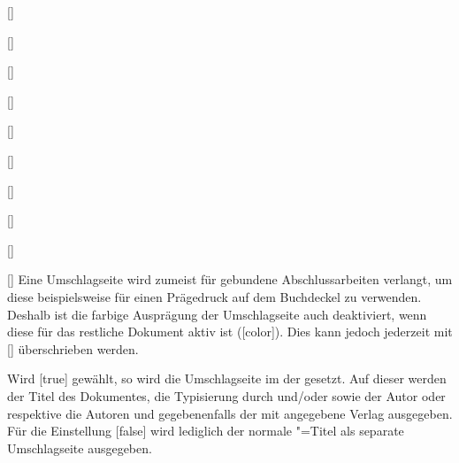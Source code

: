 \begin{Declaration*}{}
\begin{Declaration*}{}
\begin{Declaration*}{}
\begin{Declaration}{}
\begin{Declaration}[v2.02]{%
  []%
}
\begin{Declaration}{[\PBoolean]}
\begin{Declaration}[v2.02]{[\PSet]}{%
}
\begin{Declaration}[v2.03]{[\PSet]}{%
}
\begin{Declaration}[v2.03]{[\PSet]}{%
}
\begin{Declaration}[v2.03]{%
  []%
}{}
\begin{Declaration}[v2.03]{%
  []
}{}
\begin{Declaration}[v2.03]{[\PSet]}{%
}
\begin{Declaration}[v2.03]{[\PSet]}{%
}
\begin{Declaration}[v2.03]{[\PSet]}{%
}
\printdeclarationlist%
%
%
Eine Umschlagseite wird zumeist für gebundene Abschlussarbeiten verlangt, um 
diese beispielsweise für einen Prägedruck auf dem Buchdeckel zu verwenden. 
Deshalb ist die farbige Ausprägung der Umschlagseite auch deaktiviert, wenn 
diese für das restliche Dokument aktiv ist ([color]). Dies kann 
jedoch jederzeit mit [\PSet] überschrieben werden.

Wird [true] gewählt, so wird die Umschlagseite im \CD der 
\TnUD gesetzt. Auf dieser werden der Titel des Dokumentes, die Typisierung 
durch  und/oder  sowie der Autor oder respektive 
die Autoren und gegebenenfalls der mit  angegebene Verlag 
ausgegeben.
Für die Einstellung [false] wird lediglich der normale 
\KOMAScript"=Titel als separate Umschlagseite ausgegeben. 


\end{Declaration}
\end{Declaration}
\end{Declaration}
\end{Declaration}
\end{Declaration}
\end{Declaration}
\end{Declaration}
\end{Declaration}
\end{Declaration}
\end{Declaration}
\end{Declaration}
\end{Declaration*}
\end{Declaration*}
\end{Declaration*}
